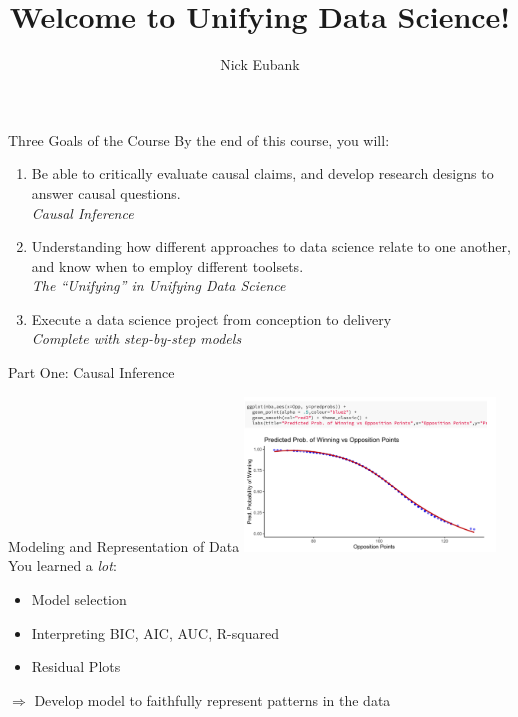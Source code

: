 \documentclass[11pt]{beamer}
\title{Welcome to Unifying Data Science!}
\author{\small Nick Eubank}
\date{\vspace*{.3in} \date}
\begin{document}
\begin{frame}[c]
\maketitle
\end{frame}

\begin{frame}[c]{Three Goals of the Course}
By the end of this course, you will:
  \begin{enumerate}
  \pause \item Be able to critically evaluate causal claims, and develop research designs to answer causal questions.  \\
  \emph{Causal Inference}
  \pause \item Understanding how different approaches to data science relate to one another, and know when to employ different toolsets. \\
  \emph{The ``Unifying'' in Unifying Data Science}
  \pause \item Execute a data science project from conception to delivery \\
  \emph{Complete with step-by-step models}
\end{enumerate}
\end{frame}

\begin{frame}[c]
  \centering
  Part One: Causal Inference
\end{frame}

\begin{frame}[c]{Modeling and Representation of Data}
  \centering
       \includegraphics[width=0.5\textwidth]{logit.png} \\
       You learned a \emph{lot}:
       \begin{itemize}
          \item Model selection 
          \item Interpreting BIC, AIC, AUC, R-squared
          \item Residual Plots
       \end{itemize}
       \pause $\Rightarrow$ Develop model to \alert{faithfully represent patterns in the data}
\end{frame}
\end{document}

